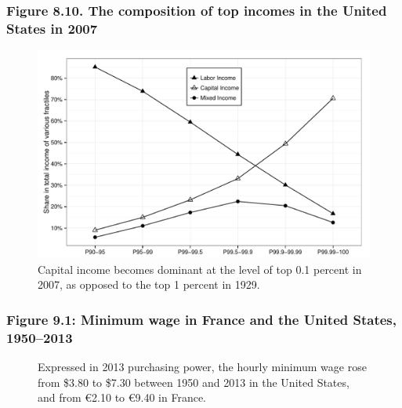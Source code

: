 \documentclass[t]{beamer}\usepackage[]{graphicx}\usepackage[]{color}
\newenvironment{knitrout}{}{} %
\begin{document}
\begin{frame}[label=Figure_8_10,fragile]
\frametitle{Figure 8.10. The composition of top incomes in the United States in 2007}
\begin{figure}[t]
\begin{minipage}[b]{\textwidth}
\centering
\begin{knitrout}\footnotesize
{}\color{fgcolor}

{\centering \includegraphics[width=1\linewidth]{figures/bw/Figure_8_10} 

}



\end{knitrout}
\caption{Capital income becomes dominant at the level of top 0.1 percent in 2007, as opposed to the top 1 percent in 1929.}
\end{minipage}
\end{figure}
\end{frame}


\begin{frame}[label=Figure_9_1]
\frametitle{Figure 9.1: Minimum wage in France and the United States, 1950--2013}
\begin{figure}[t]
\begin{minipage}[b]{\textwidth}
\centering

\caption{Expressed in 2013 purchasing power, the hourly minimum wage rose from \$3.80 to \$7.30 between 1950 and 2013 in the United States, and from \euro 2.10 to \euro 9.40 in France.}
\end{minipage}
\end{figure}
\end{frame}
\end{document}
